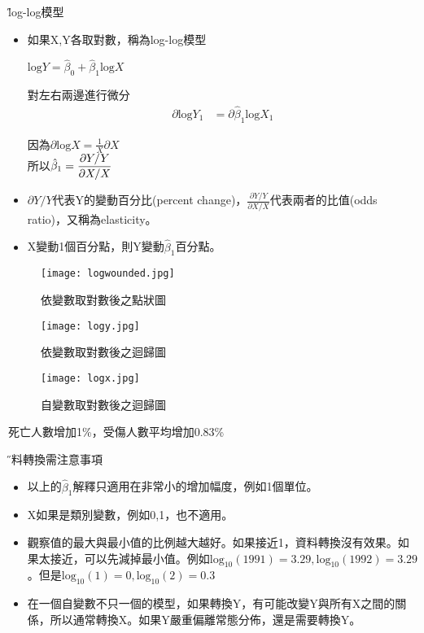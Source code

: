 \documentclass[xcolor=dvipsnames]{beamer}
\begin{document}
\begin{frame}{\H log-log模型}
\begin{itemize}
\item 如果X,Y各取對數，稱為log-log模型
\begin{center}
$\mathrm{log}Y=\hat{\beta}_{0}+\hat{\beta}_{1}\mathrm{log}X $
\end{center}
對左右兩邊進行微分
\begin{align}
\partial\mathrm{log}Y_{1} & =\partial\hat{\beta}_{1}\mathrm{log}X_{1}
\end{align}

因為$ \partial \mathrm{log}X=\frac{1}{X}\partial X $\\
\smallskip
所以$\hat{\beta}_{1}=\mathlarger{\frac{\partial Y/Y}{\partial X/X}} $
\item $ \partial Y/Y $代表Y的變動百分比(percent change)，$ \frac{\partial Y/Y}{\partial X/X} $代表兩者的比值(odds ratio)，又稱為elasticity。
\item X變動1個百分點，則Y變動$ \hat{\beta}_{1} $百分點。
\end{itemize}
\end{frame}
\begin{frame}
\begin{figure}
\texttt{[image: logwounded.jpg]}
\caption{依變數取對數後之點狀圖}
\end{figure}
\end{frame}
\begin{frame}
\begin{figure}
\texttt{[image: logy.jpg]}
\caption{依變數取對數後之迴歸圖}
\end{figure}
\end{frame}
\begin{frame}
\begin{figure}
\texttt{[image: logx.jpg]}
\caption{自變數取對數後之迴歸圖}
\end{figure}
死亡人數增加1\%，受傷人數平均增加0.83\%
\end{frame}
\begin{frame}{\H 資料轉換需注意事項}
\begin{itemize}
\item 以上的$\hat{\beta}_{1}$解釋只適用在非常小的增加幅度，例如1個單位。
\item X如果是類別變數，例如0,1，也不適用。
\item 觀察值的最大與最小值的比例越大越好。如果接近1，資料轉換沒有效果。如果太接近，可以先減掉最小值。例如$\mathrm{log}_{10}(1991)=3.29,\mathrm{log}_{10}(1992)=3.29$。但是$\mathrm{log}_{10}(1)=0,\mathrm{log}_{10}(2)=0.3$
\item 在一個自變數不只一個的模型，如果轉換Y，有可能改變Y與所有X之間的關係，所以通常轉換X。如果Y嚴重偏離常態分佈，還是需要轉換Y。
\end{itemize}
\end{frame}
\end{document}
